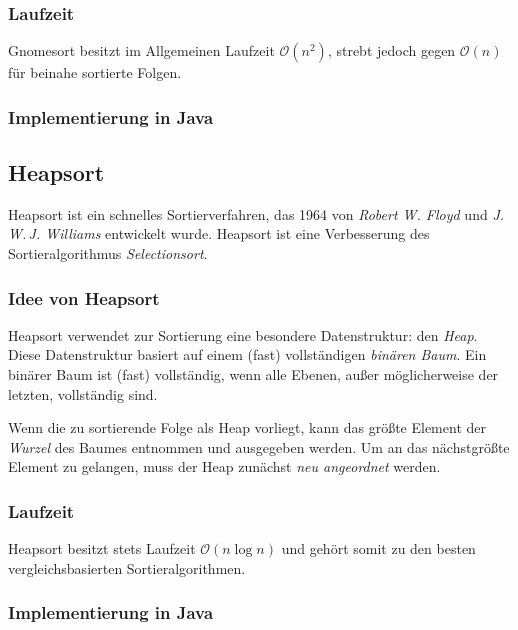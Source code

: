 \documentclass[german]{pfBook}
\newcommand{\OO}{\mathcal{O}}
\begin{document}
	\subsubsection{Laufzeit}
	
	Gnomesort besitzt im Allgemeinen Laufzeit $\OO(n^2)$, strebt jedoch gegen $\OO(n)$ für beinahe sortierte Folgen.
	
	\subsubsection{Implementierung in Java}
	
	
	
	\subsection{Heapsort}
	
	Heapsort ist ein schnelles Sortierverfahren, das 1964 von \emph{Robert W. Floyd} und \emph{J.\,W.\,J. Williams} entwickelt wurde. Heapsort ist eine Verbesserung des Sortieralgorithmus \emph{Selectionsort}.
	
	\subsubsection{Idee von Heapsort}
	
	Heapsort verwendet zur Sortierung eine besondere Datenstruktur: den \emph{Heap}. Diese Datenstruktur basiert auf einem (fast) vollständigen \emph{binären Baum}. Ein binärer Baum ist (fast) vollständig, wenn alle Ebenen, außer möglicherweise der letzten, vollständig sind.
	
	Wenn die zu sortierende Folge als Heap vorliegt, kann das größte Element der \emph{Wurzel} des Baumes entnommen und ausgegeben werden. Um an das nächstgrößte Element zu gelangen, muss der Heap zunächst \emph{neu angeordnet} werden.
	
	\subsubsection{Laufzeit}
	
	Heapsort besitzt stets Laufzeit $\OO(n \log n)$ und gehört somit zu den besten vergleichsbasierten Sortieralgorithmen.
	
	\subsubsection{Implementierung in Java}
	
\end{document}
